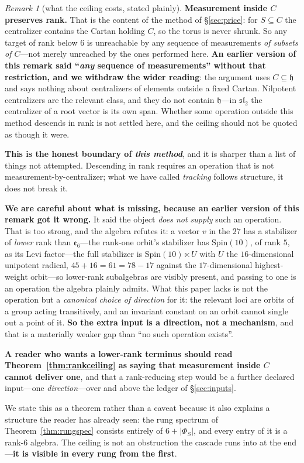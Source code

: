 \documentclass[11pt,reqno]{amsart}
\theoremstyle{plain}
\theoremstyle{definition}
\theoremstyle{remark}
\newtheorem{remark}[theorem]{Remark}
\newcommand{\sll}{\mathfrak{sl}}
\newcommand{\ee}{\mathfrak{e}}
\newcommand{\h}{\mathfrak{h}}
\begin{document}
\begin{remark}[what the ceiling costs, stated plainly]\label{rem:ceilingcost}
\textbf{Measurement inside $C$ preserves rank.} That is the content of the method of
\S\ref{sec:price}: for $S\subseteq C$ the centralizer contains the Cartan holding $C$, so
the torus is never shrunk. So any target of rank below $6$ is unreachable by any sequence
of measurements \emph{of subsets of $C$}---not merely unreached by the ones performed
here. \textbf{An earlier version of this remark said ``\emph{any} sequence of
measurements'' without that restriction, and we withdraw the wider reading}: the argument
uses $C\subseteq\h$ and says nothing about centralizers of elements outside a fixed
Cartan. Nilpotent centralizers are the relevant class, and they do not contain $\h$---in
$\sll_2$ the centralizer of a root vector is its own span. Whether some operation outside
this method descends in rank is not settled here, and the ceiling should not be quoted as
though it were.

\textbf{This is the honest boundary of \emph{this method}}, and it is sharper than a list of
things not attempted. Descending in rank requires an operation that is not
measurement-by-centralizer; what we have called \emph{tracking} follows structure, it does
not break it.

\textbf{We are careful about what is missing, because an earlier version of this remark got
it wrong.} It said the object \emph{does not supply} such an operation. That is too strong,
and the algebra refutes it: a vector $v$ in the $27$ has a stabilizer of \emph{lower} rank
than $\ee_6$---the rank-one orbit's stabilizer has $\mathrm{Spin}(10)$, of rank $5$, as its Levi
factor---the full stabilizer is $\mathrm{Spin}(10)\ltimes U$ with $U$ the $16$-dimensional
unipotent radical, $45+16=61=78-17$ against the $17$-dimensional highest-weight orbit---so
lower-rank subalgebras are visibly present, and passing to one is an operation the algebra
plainly admits. What this paper lacks is not the operation but a \emph{canonical choice of
direction} for it: the relevant loci are orbits of a group acting transitively, and an
invariant constant on an orbit cannot single out a point of it. \textbf{So the extra input
is a direction, not a mechanism}, and that is a materially weaker gap than ``no such
operation exists''.

\textbf{A reader who wants a lower-rank terminus should read
Theorem~\ref{thm:rankceiling} as saying that measurement inside $C$ cannot deliver one},
and that a rank-reducing step would be a further declared input---one \emph{direction}---over
and above the ledger of \S\ref{sec:inputs}.

We state this as a theorem rather than a caveat because it also explains a structure the
reader has already seen: the rung spectrum of Theorem~\ref{thm:rungspec} consists
entirely of $6+\lvert\Phi_S\rvert$, and every entry of it is a rank-$6$ algebra. The
ceiling is not an obstruction the cascade runs into at the end---\textbf{it is visible in
every rung from the first}.
\end{remark}
\end{document}
